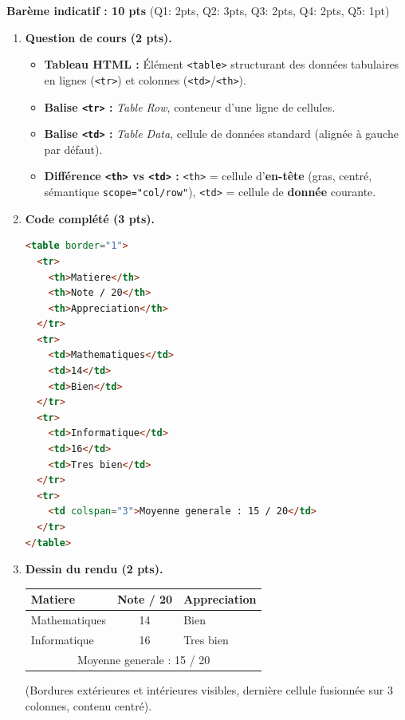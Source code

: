\documentclass[11pt]{article}
\begin{document}
\begin{corrige}
\textbf{Barème indicatif : 10 pts} (Q1: 2pts, Q2: 3pts, Q3: 2pts, Q4: 2pts, Q5: 1pt)

\begin{enumerate}
  \item \textbf{Question de cours (2 pts).}
  \begin{itemize}
    \item \textbf{Tableau HTML :} Élément \texttt{<table>} structurant des données tabulaires en lignes (\texttt{<tr>}) et colonnes (\texttt{<td>}/\texttt{<th>}).
    \item \textbf{Balise \texttt{<tr>} :} \emph{Table Row}, conteneur d'une ligne de cellules.
    \item \textbf{Balise \texttt{<td>} :} \emph{Table Data}, cellule de données standard (alignée à gauche par défaut).
    \item \textbf{Différence \texttt{<th>} vs \texttt{<td>} :} \texttt{<th>} = cellule d'\textbf{en-tête} (gras, centré, sémantique \texttt{scope="col/row"}), \texttt{<td>} = cellule de \textbf{donnée} courante.
  \end{itemize}
  
  \item \textbf{Code complété (3 pts).}
\begin{lstlisting}[language=HTML]
<table border="1">
  <tr>
    <th>Matiere</th>
    <th>Note / 20</th>
    <th>Appreciation</th>
  </tr>
  <tr>
    <td>Mathematiques</td>
    <td>14</td>
    <td>Bien</td>
  </tr>
  <tr>
    <td>Informatique</td>
    <td>16</td>
    <td>Tres bien</td>
  </tr>
  <tr>
    <td colspan="3">Moyenne generale : 15 / 20</td>
  </tr>
</table>
\end{lstlisting}
  
  \item \textbf{Dessin du rendu (2 pts).} 
  \begin{center}
  \begin{tabular}{|l|c|l|}
  \hline
  \textbf{Matiere} & \textbf{Note / 20} & \textbf{Appreciation} \\
  \hline
  Mathematiques & 14 & Bien \\
  \hline
  Informatique & 16 & Tres bien \\
  \hline
  \multicolumn{3}{|c|}{Moyenne generale : 15 / 20} \\
  \hline
  \end{tabular}
  \end{center}
  (Bordures extérieures et intérieures visibles, dernière cellule fusionnée sur 3 colonnes, contenu centré).
  

\end{enumerate}
\end{corrige}
\end{document}
